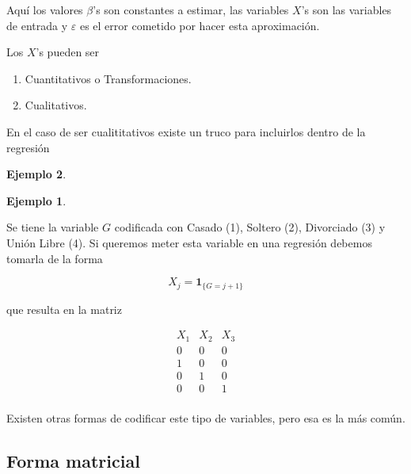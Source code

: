 \documentclass[
  12pt,
]{book}
\providecommand{\tightlist}{%
  \setlength{\itemsep}{0pt}\setlength{\parskip}{0pt}}
\theoremstyle{definition}
\theoremstyle{definition}
\newtheorem{example}{Ejemplo}[chapter]
\theoremstyle{definition}
\theoremstyle{remark}
\begin{document}
Aquí los valores \(\beta\)'s son constantes a estimar, las variables \(X\)'s son las variables de entrada y \(\varepsilon\) es el error cometido por hacer esta aproximación.

Los \(X\)'s pueden ser

\begin{enumerate}
\def\labelenumi{\arabic{enumi}.}
\tightlist
\item
  Cuantitativos o Transformaciones.
\item
  Cualitativos.
\end{enumerate}

En el caso de ser cualititativos existe un truco para incluirlos dentro de la regresión

\begin{example}
\begin{example}
\protect\hypertarget{exm:unlabeled-div-44}{}\label{exm:unlabeled-div-44}

\protect\hypertarget{exm:unnamed-chunk-169}{}{\label{exm:unnamed-chunk-169} }Se tiene la variable \(G\) codificada con Casado (1), Soltero (2), Divorciado (3) y Unión Libre (4). Si queremos meter esta variable en una regresión debemos tomarla de la forma

\begin{equation*}
X_{j} = \mathbf{1}_{\{G=j+1\}} 
\end{equation*}

que resulta en la matriz

\begin{equation*}
\begin{matrix}
X_{1} & X_{2} & X_{3}\\
0 & 0 & 0 \\
1 & 0 & 0 \\
0 & 1 & 0 \\
0 & 0 & 1 \\
\end{matrix}
\end{equation*}

Existen otras formas de codificar este tipo de variables, pero esa es la más común.

\end{example}
\end{example}

\hypertarget{forma-matricial}{%
\subsection{Forma matricial}\label{forma-matricial}}
\end{document}
